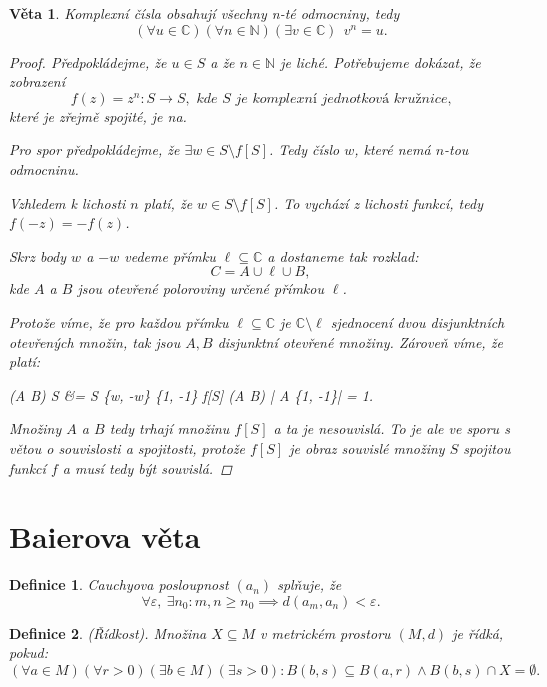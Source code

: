 \documentclass[10pt,a4paper]{article}
\newcommand{\Cc}{{\mathbb{C}}}      %
\newcommand{\N}{{\mathbb{N}}}       %
\newtheorem*{thm}{Věta}
\newtheorem{Def}{Definice}[section]
\begin{document}
\begin{thm} Komplexní čísla obsahují všechny n-té odmocniny, tedy \[(\forall u \in \Cc) (\forall n \in \N) (\exists v \in \Cc) ~~v^n = u.\]
	\begin{proof}
		Předpokládejme, že $u\in S$ a že $n \in \N$ je liché. 
		Potřebujeme dokázat, že zobrazení $$f (z) = z^n : S \to S, \textit{ kde $S$ je komplexní jednotková kružnice,}$$ které je zřejmě spojité, je \textit{na}. 
		
		Pro spor předpokládejme, že $\exists w \in S \setminus f[S]$. 
		Tedy číslo $w$, které nemá $n$-tou odmocninu. 
		
		Vzhledem k lichosti  $ n$ platí, že $w \in S \setminus f[S]$.
		To vychází z lichosti funkcí, tedy $f(-z) = -f(z)$. 
		
		Skrz body $ w $ a $ -w $ vedeme přímku $\ell \subseteq \Cc$ a dostaneme tak rozklad: 
		$$C = A \cup \ell \cup B,$$
		kde $ A $ a $ B $ jsou otevřené poloroviny určené přímkou $ \ell $. 
		
		Protože víme, že \textit{pro každou přímku $\ell \subseteq \Cc$ je $\Cc \setminus \ell$ sjednocení dvou disjunktních otevřených množin}, tak jsou $A,B$ disjunktní otevřené množiny. Zároveň víme, že platí:
		\begin{flalign*}
			(A \cup B) \cap S &= S \setminus \{w, -w\} \quad \leadsto \quad 
			\{1, -1\} \subseteq f[S] \cap (A \cup B) \quad \leadsto \quad
			| A \cap \{1, -1\}| = 1.
		\end{flalign*}
		Množiny $ A $ a $ B $ tedy trhají množinu $ f [S] $ a ta je nesouvislá. 
		To je ale ve sporu s \textit{větou o souvislosti a spojitosti}, protože $ f [S] $ je obraz souvislé množiny $ S $ spojitou funkcí $ f $ a musí tedy být souvislá.
	\end{proof}
\end{thm}

\section{Baierova věta}

\begin{Def} Cauchyova posloupnost \normalfont $(a_n)$ splňuje, že \[\forall \varepsilon, ~\exists n_0 : m, n \geq n_0 \implies d(a_m , a_n ) < \varepsilon .\]
\end{Def}

\begin{Def} (Řídkost). \normalfont
	Množina $X \subseteq M$ v metrickém prostoru $(M, d)$ je řídká, pokud:\[
(\forall a \in M) (\forall r > 0) (\exists b \in M) (\exists s > 0): B(b, s) \subseteq B(a, r) \land B(b, s) \cap X = \emptyset.
\]
\end{Def}
\end{document}
